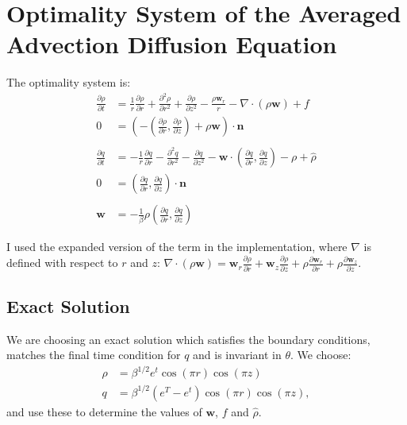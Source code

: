 \documentclass[11pt, a4paper]{article}
\theoremstyle{definition}
\newcommand{\w}{\mathbf{w}}
\newcommand{\n}{\mathbf{n}}
\newcommand{\hr}{\widehat \rho}
\begin{document}
	
	
\section*{Optimality System of the Averaged Advection Diffusion Equation}
The optimality system is:
\begin{align*}
	\frac{\partial \rho}{\partial t} &= \frac{1}{r} \frac{\partial \rho}{\partial r} +  \frac{\partial^2 \rho}{\partial r^2} + \frac{\partial \rho}{\partial z^2} - \frac{\rho\w_r}{r} - \nabla \cdot (\rho \w ) + f\\
	0 &= \left(- \left(\frac{\partial \rho}{\partial r},  \frac{\partial \rho}{\partial z}\right) + \rho \w \right) \cdot \n \\
	\\
	\frac{\partial q}{\partial t} &= - \frac{1}{r} \frac{\partial q}{\partial r} -  \frac{\partial^2 q}{\partial r^2} - \frac{\partial q}{\partial z^2} - \w \cdot \left(\frac{\partial q}{\partial r},  \frac{\partial q}{\partial z}\right) - \rho + \hr\\
	0 &= \left(\frac{\partial q}{\partial r},  \frac{\partial q}{\partial z}\right) \cdot \n \\
	\\
	\w &= - \frac{1}{\beta}\rho  \left(\frac{\partial q}{\partial r},  \frac{\partial q}{\partial z}\right)
\end{align*}

I used the expanded version of the term in the implementation, where $\nabla$ is defined with respect to $r$ and $z$:
$\nabla \cdot (\rho \w) = \w_r\frac{\partial \rho}{\partial r} + \w_z\frac{\partial \rho}{\partial z} +\rho\frac{\partial \w_r }{\partial r} + \rho\frac{\partial \w_z}{\partial z} $.
\subsection*{Exact Solution}
We are choosing an exact solution which satisfies the boundary conditions, matches the final time condition for $q$ and is invariant in $\theta$. We choose:
\begin{align*}
	\rho &= \beta^{1/2} e^t \cos(\pi r) \cos (\pi z)\\
	q &= \beta^{1/2}(e^T - e^t)\cos(\pi r)\cos(\pi z),
\end{align*}
and use these to determine the values of $\w$, $f$ and $\hr$.


	
\end{document}
